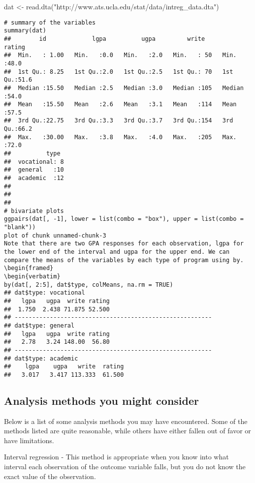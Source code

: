 dat <- read.dta("http://www.ats.ucla.edu/stat/data/intreg_data.dta")
\begin{framed}
\begin{verbatim}
# summary of the variables
summary(dat)
##        id             lgpa          ugpa         write         rating    
##  Min.   : 1.00   Min.   :0.0   Min.   :2.0   Min.   : 50   Min.   :48.0  
##  1st Qu.: 8.25   1st Qu.:2.0   1st Qu.:2.5   1st Qu.: 70   1st Qu.:51.6  
##  Median :15.50   Median :2.5   Median :3.0   Median :105   Median :54.0  
##  Mean   :15.50   Mean   :2.6   Mean   :3.1   Mean   :114   Mean   :57.5  
##  3rd Qu.:22.75   3rd Qu.:3.3   3rd Qu.:3.7   3rd Qu.:154   3rd Qu.:66.2  
##  Max.   :30.00   Max.   :3.8   Max.   :4.0   Max.   :205   Max.   :72.0  
##          type   
##  vocational: 8  
##  general   :10  
##  academic  :12  
##                 
##                 
## 
# bivariate plots
ggpairs(dat[, -1], lower = list(combo = "box"), upper = list(combo = "blank"))
plot of chunk unnamed-chunk-3
Note that there are two GPA responses for each observation, lgpa for the lower end of the interval and ugpa for the upper end. We can compare the means of the variables by each type of program using by.
\begin{framed}
\begin{verbatim}
by(dat[, 2:5], dat$type, colMeans, na.rm = TRUE)
## dat$type: vocational
##   lgpa   ugpa  write rating 
##  1.750  2.438 71.875 52.500 
## -------------------------------------------------------- 
## dat$type: general
##   lgpa   ugpa  write rating 
##   2.78   3.24 148.00  56.80 
## -------------------------------------------------------- 
## dat$type: academic
##    lgpa    ugpa   write  rating 
##   3.017   3.417 113.333  61.500

\end{verbatim}
\end{framed}


\subsection{Analysis methods you might consider}

Below is a list of some analysis methods you may have encountered. Some of the methods listed are quite reasonable, while others have either fallen out of favor or have limitations.

Interval regression - This method is appropriate when you know into what interval each observation of the outcome variable falls, but you do not know the exact value of the observation.


